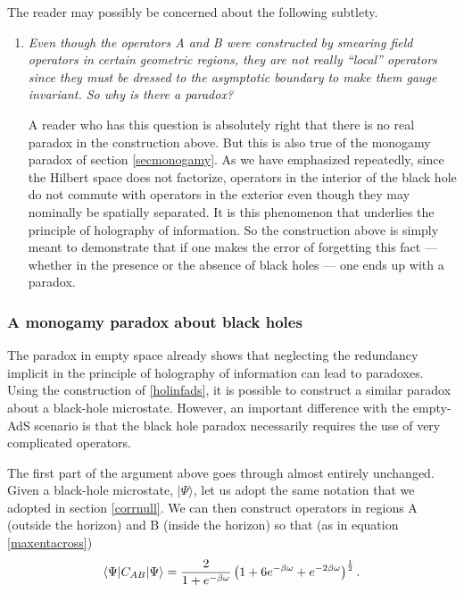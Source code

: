 \documentclass[12pt]{article}
\newcommand{\be}{\begin{equation}}
\newcommand{\ee}{\end{equation}}
\begin{document}
The reader may possibly be concerned about the following subtlety.
\begin{enumerate}[qseries]
\item
{\em
Even though the operators A and B were constructed by smearing field operators in certain geometric regions, they are not really ``local'' operators since they must be dressed to the asymptotic boundary to make them gauge invariant.  So why is there a paradox?}

A reader who has this question is absolutely right that there is no real paradox in the construction above. But this is also true of the monogamy paradox of section \ref{secmonogamy}. As we have emphasized repeatedly, since the Hilbert space does not factorize, operators in the interior of the black hole do not commute with operators in the exterior even though they may nominally be spatially separated. It is this phenomenon that underlies the principle of holography of information. So the construction above is simply meant to demonstrate that if one makes the error of forgetting this fact --- whether in the presence or the absence of black holes ---  one ends up with a paradox.
\end{enumerate}












\subsubsection{A monogamy paradox about black holes}
The paradox in empty space already shows that  neglecting the redundancy  implicit in the principle of holography
of information can lead to paradoxes. Using the construction of \ref{holinfads}, it is possible to construct a similar paradox about a black-hole microstate. However, an important difference with the empty-AdS scenario is that the black hole paradox necessarily requires the use of very complicated operators.

The first part of the argument above goes through almost entirely unchanged. Given a black-hole microstate, $|\Psi \rangle$, let us adopt the same notation that we adopted in section \ref{corrnull}. We can then
construct operators in regions A (outside the horizon) and B (inside the horizon) so that (as in equation \eqref{maxentacross})
\be
\langle \Psi | C_{AB} |\Psi \rangle =  {2 \over 1 + e^{-\beta \omega}} \left(1 + 6 e^{-{\beta \omega}} + e^{-2{\beta \omega}} \right)^{1 \over 2}.
\ee
\end{document}
